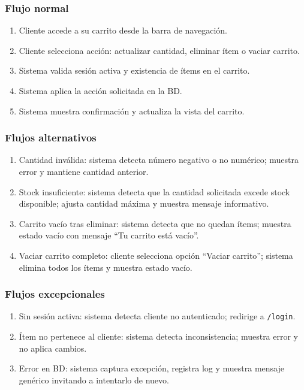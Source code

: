 \documentclass[12pt,a4paper]{article}
\begin{document}
\subsubsection*{Flujo normal}
\begin{enumerate}[label=FN-\arabic*]
    \item Cliente accede a su carrito desde la barra de navegación.
    \item Cliente selecciona acción: actualizar cantidad, eliminar ítem o vaciar carrito.
    \item Sistema valida sesión activa y existencia de ítems en el carrito.
    \item Sistema aplica la acción solicitada en la BD.
    \item Sistema muestra confirmación y actualiza la vista del carrito.
\end{enumerate}

\subsubsection*{Flujos alternativos}
\begin{enumerate}[label=FA-\arabic*]
    \item Cantidad inválida: sistema detecta número negativo o no numérico; muestra error y mantiene cantidad anterior.
    \item Stock insuficiente: sistema detecta que la cantidad solicitada excede stock disponible; ajusta cantidad máxima y muestra mensaje informativo.
    \item Carrito vacío tras eliminar: sistema detecta que no quedan ítems; muestra estado vacío con mensaje “Tu carrito está vacío”.
    \item Vaciar carrito completo: cliente selecciona opción “Vaciar carrito”; sistema elimina todos los ítems y muestra estado vacío.
\end{enumerate}

\subsubsection*{Flujos excepcionales}
\begin{enumerate}[label=FE-\arabic*]
    \item Sin sesión activa: sistema detecta cliente no autenticado; redirige a \texttt{/login}.
    \item Ítem no pertenece al cliente: sistema detecta inconsistencia; muestra error y no aplica cambios.
    \item Error en BD: sistema captura excepción, registra log y muestra mensaje genérico invitando a intentarlo de nuevo.
\end{enumerate}
\end{document}
